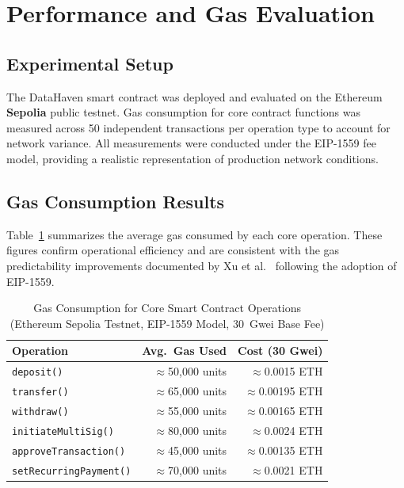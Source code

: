 \documentclass[conference]{IEEEtran}
\begin{document}
\section{Performance and Gas Evaluation}
\label{sec:evaluation}

\subsection{Experimental Setup}

The DataHaven smart contract was deployed and evaluated on the Ethereum
\textbf{Sepolia} public testnet. Gas consumption for core contract functions
was measured across 50 independent transactions per operation type to account
for network variance. All measurements were conducted under the EIP-1559 fee
model, providing a realistic representation of production network conditions.

\subsection{Gas Consumption Results}

Table~\ref{tab:gas} summarizes the average gas consumed by each core
operation. These figures confirm operational efficiency and are consistent with
the gas predictability improvements documented by Xu et al.~\cite{ref14}
following the adoption of EIP-1559.

\begin{table}[htbp]
  \caption{Gas Consumption for Core Smart Contract Operations (Ethereum Sepolia
    Testnet, EIP-1559 Model, 30~Gwei Base Fee)}
  \label{tab:gas}
  \centering
  \begin{tabular}{lrr}
    \toprule
    \textbf{Operation}          & \textbf{Avg.\ Gas Used} & \textbf{Cost (30 Gwei)} \\
    \midrule
    \texttt{deposit()}          & $\approx$50{,}000 units  & $\approx$0.0015 ETH \\
    \texttt{transfer()}         & $\approx$65{,}000 units  & $\approx$0.00195 ETH \\
    \texttt{withdraw()}         & $\approx$55{,}000 units  & $\approx$0.00165 ETH \\
    \texttt{initiateMultiSig()} & $\approx$80{,}000 units  & $\approx$0.0024 ETH \\
    \texttt{approveTransaction()}& $\approx$45{,}000 units & $\approx$0.00135 ETH \\
    \texttt{setRecurringPayment()}& $\approx$70{,}000 units & $\approx$0.0021 ETH \\
    \bottomrule
  \end{tabular}
\end{table}
\end{document}
